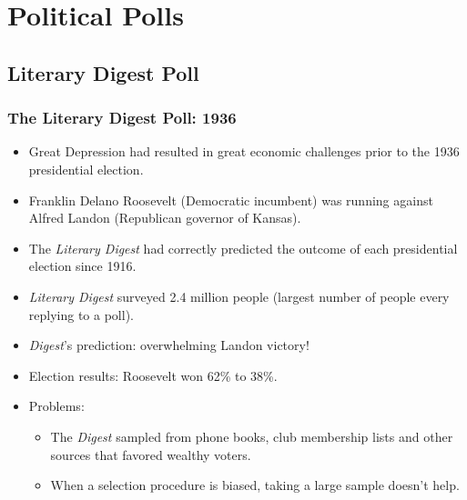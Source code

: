\documentclass[t]{beamer}
\begin{document}
\section{Political Polls}
\subsection{Literary Digest Poll}
\begin{frame}
\frametitle{The Literary Digest Poll:  1936}
\footnotesize

\begin{itemize}
\item Great Depression had resulted in great economic challenges prior to the 1936 
    presidential election.
\item Franklin Delano Roosevelt (Democratic incumbent) was running against Alfred Landon 
   (Republican governor of Kansas).
\item The \textit{Literary Digest} had correctly predicted the outcome of each 
   presidential election since 1916.
\item \textit{Literary Digest} surveyed 2.4 million people (largest number of people 
   every replying to a poll).
\item \textit{Digest}'s prediction:  overwhelming Landon victory!
\item Election results:  Roosevelt won 62\% to 38\%.
\item Problems:
   \begin{itemize}
   \item \footnotesize The \textit{Digest} sampled from phone books, club membership lists and 
     other sources that favored wealthy voters.
   \item \footnotesize When a selection procedure is biased, taking a large sample doesn't help.
   \end{itemize}
\end{itemize}
\end{frame}
\end{document}

